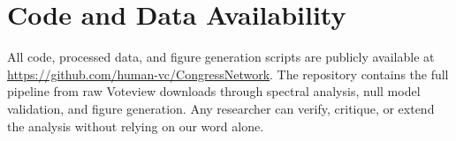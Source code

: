 \documentclass[12pt, a4paper]{article}
\begin{document}
\section{Code and Data Availability}

All code, processed data, and figure generation scripts are publicly available at \url{https://github.com/human-vc/CongressNetwork}. The repository contains the full pipeline from raw Voteview downloads through spectral analysis, null model validation, and figure generation. Any researcher can verify, critique, or extend the analysis without relying on our word alone.
\end{document}
